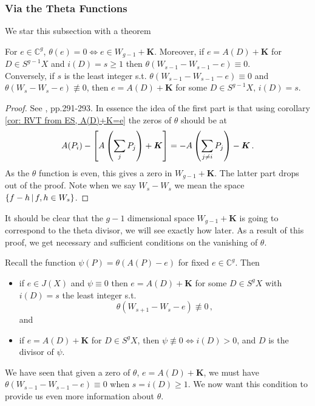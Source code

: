\documentclass{article}
\begin{document}
\subsubsection{Via the Theta Functions}

We star this subsection with a theorem

\begin{theorem}
	For $e \in \mathbb{C}^g$, $\theta(e)=0 \Leftrightarrow e \in W_{g-1}+\bm{K}$. Moreover, if $e=A(D)+\bm{K}$ for $D\in S^{g-1}X$ and $i(D) = s \geq 1$ then $\theta(W_{s-1} - W_{s-1} -e) \equiv 0$. \\
	Conversely, if $s$ is the least integer s.t. $\theta(W_{s-1} - W_{s-1} -e) \equiv 0$ and $\theta(W_{s} - W_{s} -e) \not\equiv 0$, then $e = A(D) + \bm{K}$ for some $D \in S^{g-1}X, \, i(D) = s$. 
\end{theorem}
\begin{proof}
	See \cite{Farkas1992}, pp.291-293. In essence the idea of the first part is that using corollary \ref{cor: RVT from ES, A(D)+K=e} the zeros of $\theta$ should be at
	\[
	A(P_i) - \left[ A\left( \sum_j P_j \right) + \bm{K} \right]  = -A\left( \sum_{j \neq i} P_j \right) - \bm{K} \, .
	\] 
	As the $\theta$ function is even, this gives a zero in $W_{g-1}+\bm{K}$. The latter part drops out of the proof. Note when we say $W_s - W_s$ we mean the space $\left\{ f - h \, | \, f, h \in W_s \right\}$. 
\end{proof}

It should be clear that the $g-1$ dimensional space $W_{g-1}+\bm{K}$ is going to correspond to the theta divisor, we will see exactly how later. As a result of this proof, we get necessary and sufficient conditions on the vanishing of $\theta$. 

\begin{theorem}
	Recall the function $\psi(P) = \theta(A(P)-e)$ for fixed $e \in \mathbb{C}^g$. Then 
	\begin{itemize}
		\item if $e \in J(X)$ and $\psi \equiv 0$ then $e = A(D)+\bm{K}$ for some $D \in S^gX$ with $i(D)=s$ the least integer s.t. 
		\[
		\theta(W_{s+1} - W_s - e) \not \equiv 0 \, ,
		\]
		and 
		\item if $e = A(D) +\bm{K}$ for $D\in S^gX$, then $\psi \not \equiv 0 \Leftrightarrow i(D)>0$, and $D$ is the divisor of $\psi$. 
	\end{itemize}
\end{theorem}

We have seen that given a zero of $\theta$, $e=A(D)+\bm{K}$, we must have $\theta(W_{s-1}-W_{s-1}-e)\equiv 0$ when $s=i(D)\geq 1$. We now want this condition to provide us even more information about $\theta$. 
\end{document}
